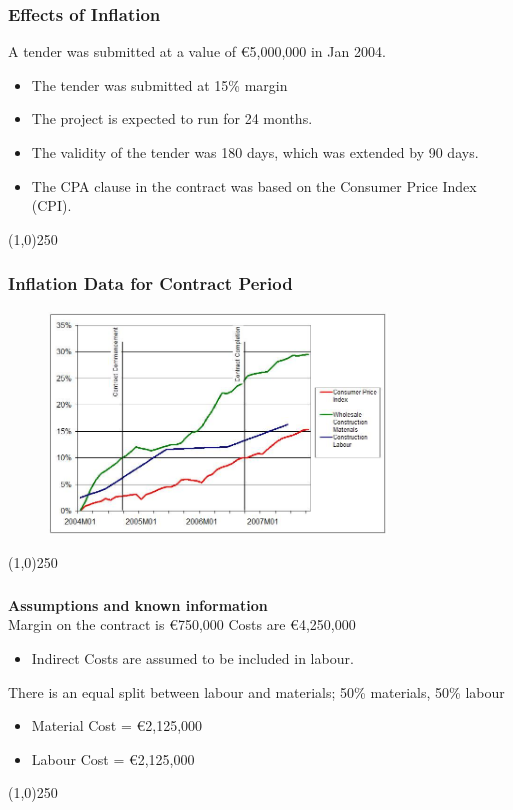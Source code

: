 \begin{frame}
\frametitle{Effects of Inflation}
A tender was submitted at a value of \euro5,000,000 in Jan 2004.\\
\begin{itemize}
	\item The tender was submitted at 15\% margin  
	\item The project is expected to run for 24 months.  
	\item The validity of the tender was 180 days, which was extended by 90 days.  
	\item The CPA clause in the contract was based on the Consumer Price Index (CPI).
\end{itemize}
\end{frame}
\begin{center}\line(1,0){250}\end{center}






\begin{frame}
\frametitle{Inflation Data for Contract Period}
\begin{figure}
	\centering
		\includegraphics[width = 9cm]{images/infcontract.jpg}
	\label{fig:infcontract}
\end{figure}

\end{frame}
\begin{center}\line(1,0){250}\end{center}






\begin{frame}
\frametitle{}
\textbf{Assumptions and known information}\\
Margin on the contract is \euro750,000
Costs are \euro4,250,000
	\begin{itemize}
		\item Indirect Costs are assumed to be included in labour.
	\end{itemize}
There is an equal split between labour and materials; 50\% materials, 50\% labour
	\begin{itemize}
		\item Material Cost = \euro2,125,000
		\item Labour Cost = \euro2,125,000
	\end{itemize}
\end{frame}
\begin{center}\line(1,0){250}\end{center}







